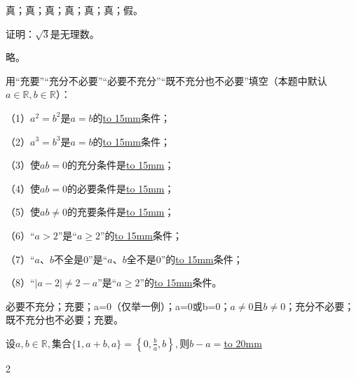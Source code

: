 \documentclass[lang=cn,newtx,10pt,scheme=chinese]{elegantbook}
\begin{document}
\begin{solution}
  真；真；真；真；真；真；假。
\end{solution}
\begin{exercise}\label{202407081520}
  证明：$\sqrt{3}$是无理数。
\end{exercise}
\begin{solution}
  略。
\end{solution}
\begin{exercise}\label{BJ4Z_Algebra1_P28.2}
  用“充要”“充分不必要”“必要不充分”“既不充分也不必要”填空（本题中默认$a\in\mathbb{R},b\in\mathbb{R}$）：

  （1）$a^2=b^2$是$a=b$的\underline{\hbox to 15mm{}}条件；

  （2）$a^3=b^3$是$a=b$的\underline{\hbox to 15mm{}}条件；

  （3）使$ab=0$的充分条件是\underline{\hbox to 15mm{}}；

  （4）使$ab=0$的必要条件是\underline{\hbox to 15mm{}}；

  （5）使$ab\neq 0$的充要条件是\underline{\hbox to 15mm{}}；

  （6）“$a>2$”是“$a\geqslant2$”的\underline{\hbox to 15mm{}}条件；

  （7）“$a、b$不全是0”是“$a、b$全不是0”的\underline{\hbox to 15mm{}}条件；

  （8）“$\vert a-2\vert\neq2-a$”是“$a\geqslant2$”的\underline{\hbox to 15mm{}}条件。
\end{exercise}
\begin{solution}
  必要不充分；充要；a=0（仅举一例）；a=0或b=0；$a\neq 0$且$b\neq 0$；充分不必要；既不充分也不必要；充要。
\end{solution}
\begin{exercise}\label{202407081031}
  $\text{设}a,b\in\mathbb{R},\text{集合}\{1,a+b,a\}=\left\{0,\frac{b}{a},b\right\},\text{则}b-a=$\underline{\hbox to 20mm{}}
\end{exercise}
\begin{solution}
  2
\end{solution}
\end{document}
